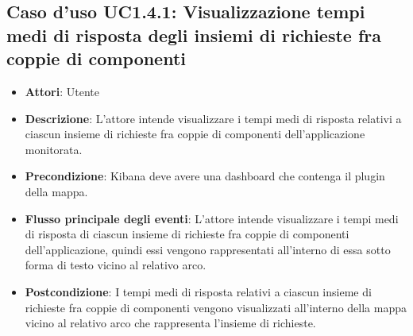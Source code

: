 \subsection{Caso d'uso UC1.4.1: Visualizzazione tempi medi di risposta degli insiemi di richieste fra coppie di componenti}
\begin{itemize}
\item \textbf{Attori}: Utente
\item \textbf{Descrizione}: L'attore intende visualizzare i tempi medi di risposta relativi a ciascun insieme di richieste fra coppie di componenti dell'applicazione monitorata.
\item \textbf{Precondizione}: Kibana deve avere una dashboard che contenga il plugin della mappa.
\item \textbf{Flusso principale degli eventi}: L'attore intende visualizzare i tempi medi di risposta di ciascun insieme di richieste fra coppie di componenti dell'applicazione, quindi essi vengono rappresentati all'interno di essa sotto forma di testo vicino al relativo arco.
\item \textbf{Postcondizione}: I tempi medi di risposta relativi a ciascun insieme di richieste fra coppie di componenti vengono visualizzati all'interno della mappa vicino al relativo arco che rappresenta l'insieme di richieste.
\end{itemize}

